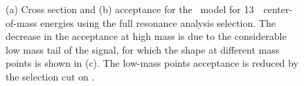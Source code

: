 \begin{figure}[!htb]
  \centering
  \caption{(a) Cross section and (b) acceptance for the \Wprime\ model for 13~\TeV~center-of-mass energies using the full resonance
  analysis selection. The decrease in the acceptance at high mass is due to the considerable low mass tail of the signal, for which the shape at different mass points is shown in (c). The low-mass points acceptance is reduced by the selection cut on \mjj.
  \label{fig:wprimeacc}}
\end{figure}


